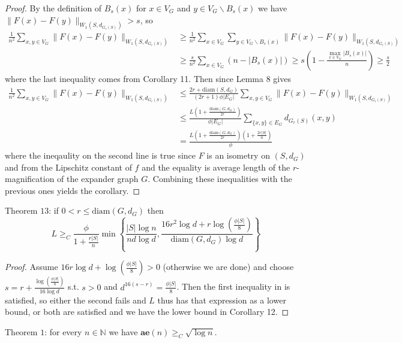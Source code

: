 \begin{proof}
By the definition of $B_s(x)$ for $x\in V_G$ and $y\in V_G\backslash B_s(x)$ we have $\|F(x)-F(y)\|_{W_1(S,d_{G_r(S)})}>s$, so
\begin{align*}
\frac{1}{n^2}\sum\limits_{x,y\in V_G}\|F(x)-F(y)\|_{W_1(S,d_{G_r(S)})}&\ge\frac{1}{n^2}\sum\limits_{x\in V_G}\sum\limits_{y\in V_G\backslash B_s(x)}\|F(x)-F(y)\|_{W_1(S,d_{G_r(S)})}\\
&\ge\frac{s}{n^2}\sum\limits_{x\in V_G}(n-|B_s(x)|)\ge s\left(1-\frac{\max\limits_{x\in V_G}|B_s(x)|}{n}\right)\ge\frac{s}{2}
\end{align*}
where the last inequality comes from Corollary 11. Then since Lemma 8 gives
\begin{align*}
\frac{1}{n^2}\sum\limits_{x,y\in V_G}\|F(x)-F(y)\|_{W_1(S,d_{G_r(S)})}&\le\frac{2r+\textrm{diam}(S,d_G)}{(2r+1)\phi|E_G|}\sum\limits_{x,y\in V_G}\|F(x)-F(y)\|_{W_1(S,d_{G_r(S)})}\\
&\le\frac{L\left(1+\frac{\textrm{diam}(G,d_G)}{2r}\right)}{\phi|E_G|}\sum\limits_{\{x,y\}\in E_G}d_{G_r(S)}(x,y)\\
&=\frac{L\left(1+\frac{\textrm{diam}(G,d_G)}{2r}\right)\left(1+\frac{2r|S|}{n}\right)}{\phi}
\end{align*}
where the ineqaulity on the second line is true since $F$ is an isometry on $(S,d_G)$ and from the Lipschitz constant of $f$ and the equality is average length of the $r$-magnification of the expander graph $G$. Combining these inequalities with the previous ones yields the corollary.
\end{proof}
\begin{thm} Theorem $13$: if $0<r\le\textrm{diam}(G,d_G)$ then 
$$L\ge_C\frac{\phi}{1+\frac{r|S|}{n}}\min\left\{\frac{|S|\log n}{nd\log d},\frac{16r^2\log d+r\log\left(\frac{\phi|S|}{8}\right)}{\textrm{diam}(G,d_G)\log d}\right\}$$
\end{thm}
\begin{proof}
Assume $16r\log d+\log\left(\frac{\phi|S|}{8}\right)>0$ (otherwise we are done) and choose $s=r+\frac{\log\left(\frac{\phi|S|}{8}\right)}{16\log d}$ s.t. $s>0$ and $d^{16(s-r)}=\frac{\phi|S|}{8}$. Then the first inequality in  is satisfied, so either the second fails and $L$ thus has that expression as a lower bound, or both are satisfied and we have the lower bound in Corollary 12.
\end{proof}
\begin{thm} Theorem $1$: for every $n\in\mathbb{N}$ we have $\textbf{ae}(n)\ge_C\sqrt{\log n}$.
\end{thm}
